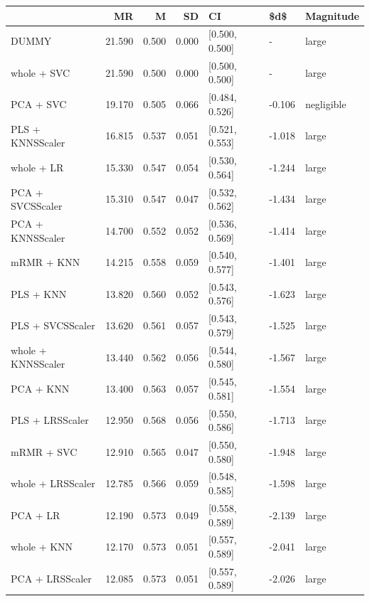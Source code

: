 \documentclass[a4paper,oneside,11pt,leqno]{article}
\begin{document}
	\begin{table}[h]
		\centering
		\begin{tabular}{lrrrlll}
			\toprule
			{} &     MR &     M &    SD &              CI &    \$d\$ &   Magnitude \\
			\midrule
			DUMMY              & 21.590 & 0.500 & 0.000 &  [0.500, 0.500] &      - &       large \\
			whole + SVC        & 21.590 & 0.500 & 0.000 &  [0.500, 0.500] &      - &       large \\
			PCA + SVC          & 19.170 & 0.505 & 0.066 &  [0.484, 0.526] & -0.106 &  negligible \\
			PLS + KNNSScaler   & 16.815 & 0.537 & 0.051 &  [0.521, 0.553] & -1.018 &       large \\
			whole + LR         & 15.330 & 0.547 & 0.054 &  [0.530, 0.564] & -1.244 &       large \\
			PCA + SVCSScaler   & 15.310 & 0.547 & 0.047 &  [0.532, 0.562] & -1.434 &       large \\
			PCA + KNNSScaler   & 14.700 & 0.552 & 0.052 &  [0.536, 0.569] & -1.414 &       large \\
			mRMR + KNN         & 14.215 & 0.558 & 0.059 &  [0.540, 0.577] & -1.401 &       large \\
			PLS + KNN          & 13.820 & 0.560 & 0.052 &  [0.543, 0.576] & -1.623 &       large \\
			PLS + SVCSScaler   & 13.620 & 0.561 & 0.057 &  [0.543, 0.579] & -1.525 &       large \\
			whole + KNNSScaler & 13.440 & 0.562 & 0.056 &  [0.544, 0.580] & -1.567 &       large \\
			PCA + KNN          & 13.400 & 0.563 & 0.057 &  [0.545, 0.581] & -1.554 &       large \\
			PLS + LRSScaler    & 12.950 & 0.568 & 0.056 &  [0.550, 0.586] & -1.713 &       large \\
			mRMR + SVC         & 12.910 & 0.565 & 0.047 &  [0.550, 0.580] & -1.948 &       large \\
			whole + LRSScaler  & 12.785 & 0.566 & 0.059 &  [0.548, 0.585] & -1.598 &       large \\
			PCA + LR           & 12.190 & 0.573 & 0.049 &  [0.558, 0.589] & -2.139 &       large \\
			whole + KNN        & 12.170 & 0.573 & 0.051 &  [0.557, 0.589] & -2.041 &       large \\
			PCA + LRSScaler    & 12.085 & 0.573 & 0.051 &  [0.557, 0.589] & -2.026 &       large \\

\end{tabular}
\end{table}
\end{document}
